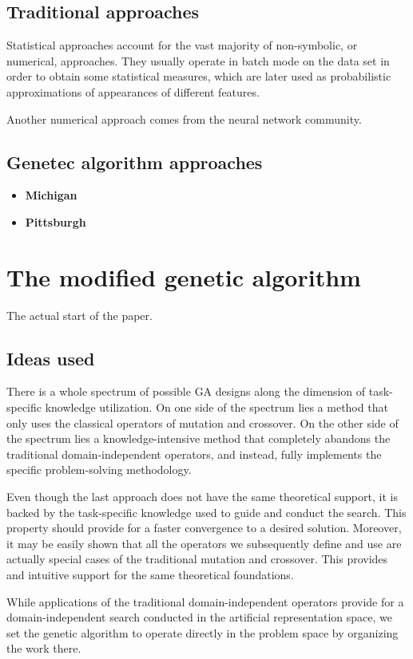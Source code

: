 \documentclass[12pt]{book}
\begin{document}
\subsection{Traditional approaches}
Statistical approaches account for the vast majority of non-symbolic, or numerical, approaches. They usually operate in batch mode on the data set in order to obtain some statistical measures, which are later used as probabilistic approximations of appearances of different features.

Another numerical approach comes from the neural network community.

\subsection{Genetec algorithm approaches}
\begin{itemize}
\item \textbf{Michigan}
\item \textbf{Pittsburgh}
\end{itemize}

\section{The modified genetic algorithm}
The actual start of the paper.

\subsection{Ideas used}
There is a whole spectrum of possible GA designs along the dimension of task-specific knowledge utilization. On one side of the spectrum lies a method that only uses the classical operators of mutation and crossover. On the other side of the spectrum lies a knowledge-intensive method that completely abandons the traditional domain-independent operators, and instead, fully implements the specific problem-solving methodology.

Even though the last approach does not have the same theoretical support, it is backed by the task-specific knowledge used to guide and conduct the search. This property should provide for a faster convergence to a desired solution. Moreover, it may be easily shown that all the operators we subsequently define and use are actually special cases of the traditional mutation and crossover. This provides and intuitive support for the same theoretical foundations.

While applications of the traditional domain-independent operators provide for a domain-independent search conducted in the artificial representation space, we set the genetic algorithm to operate directly in the problem space by organizing the work there.
\end{document}
